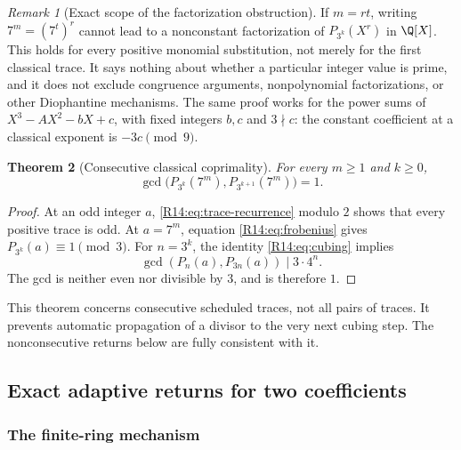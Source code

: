\documentclass[11pt,a4paper]{article}
\newtheorem{theorem}{Theorem}[section]
\theoremstyle{definition}\newtheorem{definition}[theorem]{Definition}
\theoremstyle{remark}\newtheorem{remark}[theorem]{Remark}
\begin{document}
\begin{remark}[Exact scope of the factorization obstruction]
If $m=rt$, writing $7^m=(7^t)^r$ cannot lead to a nonconstant
factorization of $P_{3^k}(X^r)$ in $\Q[X]$. This holds for every
positive monomial substitution, not merely for the first classical
trace. It says nothing about whether a particular integer value is
prime, and it does not exclude congruence arguments, nonpolynomial
factorizations, or other Diophantine mechanisms. The same proof
works for the power sums of $X^3-AX^2-bX+c$, with fixed integers
$b,c$ and $3\nmid c$: the constant coefficient at a classical
exponent is $-3c\pmod9$.
\end{remark}

\begin{theorem}[Consecutive classical coprimality]\label{R14:thm:gcd}
For every $m\ge1$ and $k\ge0$,
\[
 \gcd\bigl(P_{3^k}(7^m),P_{3^{k+1}}(7^m)\bigr)=1.
\]
\end{theorem}

\begin{proof}
At an odd integer $a$, \eqref{R14:eq:trace-recurrence} modulo $2$ shows
that every positive trace is odd. At $a=7^m$, equation
\eqref{R14:eq:frobenius} gives $P_{3^k}(a)\equiv1\pmod3$.
For $n=3^k$, the identity \eqref{R14:eq:cubing} implies
\[
 \gcd(P_n(a),P_{3n}(a))\mid3\cdot4^n.
\]
The gcd is neither even nor divisible by $3$, and is therefore $1$.
\end{proof}

This theorem concerns consecutive scheduled traces, not all pairs
of traces. It prevents automatic propagation of a divisor to the
very next cubing step. The nonconsecutive returns below are fully
consistent with it.

\subsection{Exact adaptive returns for two coefficients}

\subsubsection{The finite-ring mechanism}
\end{document}
